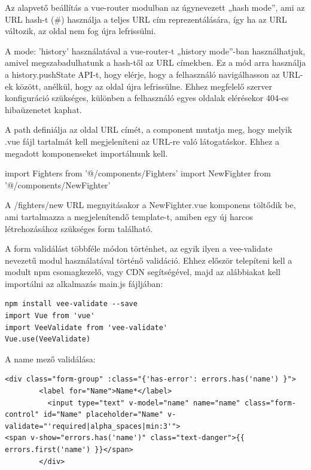 Az alapvető beállítás a vue-router modulban az úgynevezett „hash mode”, ami az URL hash-t (\#) használja a teljes URL cím reprezentálására, így ha az URL változik, az oldal nem fog újra lefrissülni.

A mode: ’history’ használatával a vue-router-t „history mode”-ban használhatjuk, amivel megszabadulhatunk a hash-től az URL címekben. Ez a mód arra használja a history.pushState API-t, hogy elérje, hogy a felhasználó navigálhasson az URL-ek között, anélkül, hogy az oldal újra lefrissülne. Ehhez megfelelő szerver konfiguráció szükséges, különben a felhasználó egyes oldalak elérésekor 404-es hibaüzenetet kaphat.

A path definiálja az oldal URL címét, a component mutatja meg, hogy melyik .vue fájl tartalmát kell megjeleníteni az URL-re való látogatáskor. Ehhez a megadott komponenseket importálnunk kell.

\begin{cpp}
import Fighters from '@/components/Fighters'
import NewFighter from '@/components/NewFighter'
\end{cpp}

A /fighters/new URL megnyitásakor a NewFighter.vue komponens töltődik be, ami tartalmazza a megjelenítendő template-t, amiben egy új harcos létrehozásához szükséges form található.


A form validálást többféle módon történhet, az egyik ilyen a vee-validate nevezetű modul használatával történő validáció. Ehhez először telepíteni kell a modult npm csomagkezelő, vagy CDN segítségével, majd az alábbiakat kell importálni az alkalmazás main.js fájljában:

\begin{verbatim}
npm install vee-validate --save
import Vue from 'vue'
import VeeValidate from 'vee-validate'
Vue.use(VeeValidate)
\end{verbatim}

A name mező validálása:

\begin{verbatim}
<div class="form-group" :class="{'has-error': errors.has('name') }">
        <label for="Name">Name*</label>
          <input type="text" v-model="name" name="name" class="form-control" id="Name" placeholder="Name" v-validate="'required|alpha_spaces|min:3'"> 
<span v-show="errors.has('name')" class="text-danger">{{ errors.first('name') }}</span>
        </div>
\end{verbatim}

